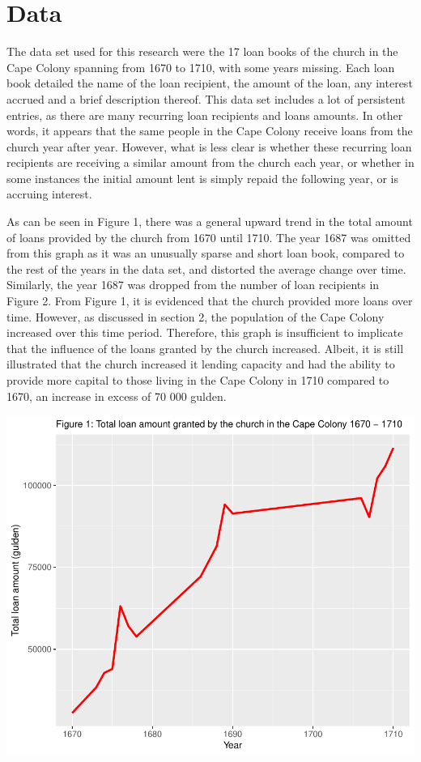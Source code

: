 \documentclass[11pt,preprint, authoryear]{elsarticle}
\numberwithin{equation}{section}
\numberwithin{figure}{section}
\numberwithin{table}{section}
\begin{document}
\hypertarget{data}{%
\section{\texorpdfstring{Data \label{Data}}{Data }}\label{data}}

The data set used for this research were the 17 loan books of the church
in the Cape Colony spanning from 1670 to 1710, with some years missing.
Each loan book detailed the name of the loan recipient, the amount of
the loan, any interest accrued and a brief description thereof. This
data set includes a lot of persistent entries, as there are many
recurring loan recipients and loans amounts. In other words, it appears
that the same people in the Cape Colony receive loans from the church
year after year. However, what is less clear is whether these recurring
loan recipients are receiving a similar amount from the church each
year, or whether in some instances the initial amount lent is simply
repaid the following year, or is accruing interest.

As can be seen in Figure 1, there was a general upward trend in the
total amount of loans provided by the church from 1670 until 1710. The
year 1687 was omitted from this graph as it was an unusually sparse and
short loan book, compared to the rest of the years in the data set, and
distorted the average change over time. Similarly, the year 1687 was
dropped from the number of loan recipients in Figure 2. From Figure 1,
it is evidenced that the church provided more loans over time. However,
as discussed in section 2, the population of the Cape Colony increased
over this time period. Therefore, this graph is insufficient to
implicate that the influence of the loans granted by the church
increased. Albeit, it is still illustrated that the church increased it
lending capacity and had the ability to provide more capital to those
living in the Cape Colony in 1710 compared to 1670, an increase in
excess of 70 000 gulden.

\includegraphics{HistoryEssay_files/figure-latex/unnamed-chunk-1-1.pdf}
\end{document}
